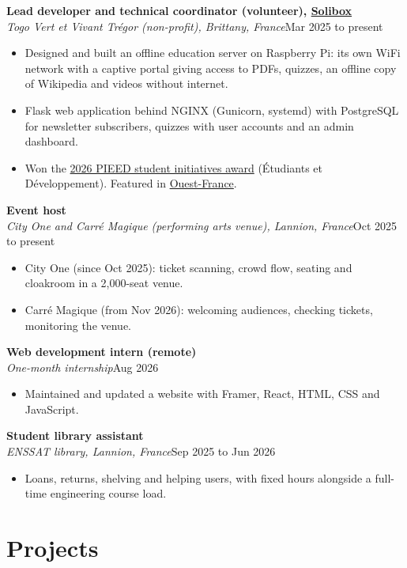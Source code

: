 \documentclass[10pt,a4paper]{article}
\newcommand{\entry}[3]{%
  \par\addvspace{6pt}%
  \noindent\textbf{#1}\\
  \textit{#2}\hfill #3\par
}
\newcommand{\project}[2]{\href{https://masterkpg.github.io/\#project-#1}{#2}}
\begin{document}
\entry{Lead developer and technical coordinator (volunteer), \project{solibox}{Solibox}}{Togo Vert et Vivant Trégor (non-profit), Brittany, France}{Mar 2025 to present}
\begin{itemize}
  \item Designed and built an offline education server on Raspberry Pi: its own WiFi network with a
        captive portal giving access to PDFs, quizzes, an offline copy of Wikipedia and videos
        without internet.
  \item Flask web application behind NGINX (Gunicorn, systemd) with PostgreSQL for newsletter
        subscribers, quizzes with user accounts and an admin dashboard.
  \item Won the \href{https://pieed.wordpress.com/category/editions-du-pieed/pieed-2026/}{2026 PIEED
        student initiatives award} (Étudiants et Développement). Featured in
        \href{https://www.ouest-france.fr/associations/quel-est-limpact-de-votre-telephone-cette-association-bretonne-le-montre-grace-a-solibox-sa-mallette-pedagogique-d03753e6-b826-11f1-ad16-43b274a58389}{Ouest-France}.
\end{itemize}

\entry{Event host}{City One and Carré Magique (performing arts venue), Lannion, France}{Oct 2025 to present}
\begin{itemize}
  \item City One (since Oct 2025): ticket scanning, crowd flow, seating and cloakroom in a
        2,000-seat venue.
  \item Carré Magique (from Nov 2026): welcoming audiences, checking tickets, monitoring the venue.
\end{itemize}

\entry{Web development intern (remote)}{One-month internship}{Aug 2026}
\begin{itemize}
  \item Maintained and updated a website with Framer, React, HTML, CSS and JavaScript.
\end{itemize}

\entry{Student library assistant}{ENSSAT library, Lannion, France}{Sep 2025 to Jun 2026}
\begin{itemize}
  \item Loans, returns, shelving and helping users, with fixed hours alongside a full-time
        engineering course load.
\end{itemize}

\section*{Projects}
\end{document}
